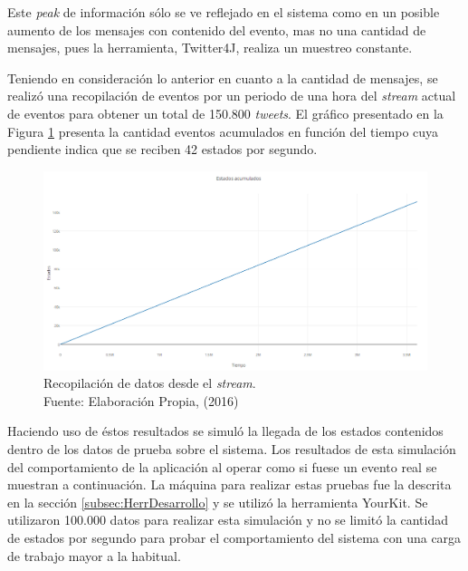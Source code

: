 Este \textit{peak} de información sólo se ve reflejado en el sistema como en un posible aumento de los mensajes con contenido del evento, mas no una cantidad de mensajes, pues la herramienta, Twitter4J, realiza un muestreo constante. 

Teniendo en consideración lo anterior en cuanto a la cantidad de mensajes, se realizó una recopilación de eventos por un periodo de una hora del \textit{stream} actual de eventos para obtener un total de 150.800 \textit{tweets}. El gráfico presentado en la Figura \ref{fig:graficoAcumulado} presenta la cantidad eventos acumulados en función del tiempo cuya pendiente indica que se reciben 42 estados por segundo.

\begin{figure}[H]
        \centering
        \captionsetup{justification=centering}
        \includegraphics[scale=0.5]{images/DatosAcumulados.png}
        \caption[Recopilación de datos desde el \textit{stream}.]{Recopilación de datos desde el \textit{stream}.\\Fuente: Elaboración Propia, (2016)}
        \label{fig:graficoAcumulado}
\end{figure}

Haciendo uso de éstos resultados se simuló la llegada de los estados contenidos dentro de los datos de prueba sobre el sistema. Los resultados de esta simulación del comportamiento de la aplicación al operar como si fuese un evento real se muestran a continuación. La máquina para realizar estas pruebas fue la descrita en la sección \ref{subsec:HerrDesarrollo} y se utilizó la herramienta YourKit. Se utilizaron 100.000 datos para realizar esta simulación y no se limitó la cantidad de estados por segundo para probar el comportamiento del sistema con una carga de trabajo mayor a la habitual.

